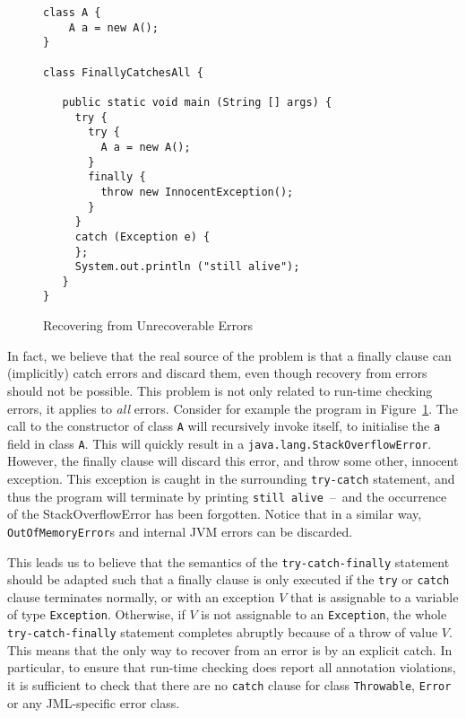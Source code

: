 \documentclass[]{llncs}
\begin{document}
\begin{figure}[t]
\begin{verbatim}
class A {
    A a = new A();
}

class FinallyCatchesAll {

   public static void main (String [] args) {
     try {
       try { 
         A a = new A();
       }
       finally {
         throw new InnocentException();
       }
     }
     catch (Exception e) {
     };
     System.out.println ("still alive");
   }
}
\end{verbatim}
\caption{Recovering from Unrecoverable Errors}\label{FigStackOverflow}
\end{figure}

In fact, we believe that the real source of the problem is that a
finally clause can (implicitly) catch errors and discard
them, even though recovery from errors should not be possible. This
problem is not only related to run-time checking errors, it applies to
\emph{all} errors. Consider for example the program in
Figure~\ref{FigStackOverflow}. The call to the constructor of class
\texttt{A} will recursively invoke itself, to initialise the
\texttt{a} field in class \texttt{A}. This will quickly result in a
\texttt{java.lang.StackOverflowError}. However, the finally clause
will discard this error, and throw some other, innocent
exception. This exception is caught in the surrounding
\texttt{try-catch} statement, and thus the program will terminate by
printing \texttt{still alive}~--~and the occurrence of the
StackOverflowError has been forgotten. Notice that in a similar way,
\texttt{OutOfMemoryError}s and internal JVM errors can be
discarded. 

This leads us to believe that the semantics of the
\texttt{try-catch-finally} statement should be adapted such that a
finally clause is only executed if the \texttt{try} or \texttt{catch}
clause terminates normally, or with an exception \(V\) that is
assignable to a variable of type \texttt{Exception}. Otherwise, if
\(V\) is not assignable to an \texttt{Exception}, the
whole \texttt{try-catch-finally} statement completes abruptly because
of a throw of value \(V\). This means that the only way to recover
from an error is by an explicit catch. In particular, to
ensure that run-time checking does report all annotation violations,
it is sufficient to check that there are no \texttt{catch} clause for
class \texttt{Throwable}, \texttt{Error} or any JML-specific error
class.
\end{document}
